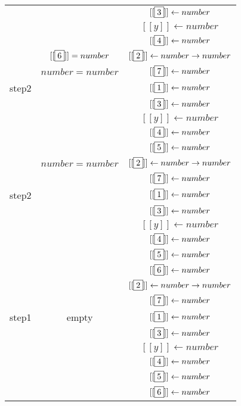 \documentclass[letterpaper,11pt]{article}
\begin{document}
\begin{enumerate}
\begin{center}
\begin{longtable}{|c|c|c|}
            &&$[[\fbox{3}]] \leftarrow number$ \\
            &&$[[y]] \leftarrow number$ \\ 
            &&$[[\fbox{4}]] \leftarrow number$ \\
            \hline
            &$[[\fbox{6}]]=number$&
            $[[\fbox{2}]] \leftarrow number \rightarrow number$ \\ 
            &$number=number$& $[[\fbox{7}]] \leftarrow number$\\
            step2&&$[[\fbox{1}]] \leftarrow number$ \\ 
            &&$[[\fbox{3}]] \leftarrow number$ \\ 
            \hline
            &&$[[y]] \leftarrow number$ \\ 
            &&$[[\fbox{4}]] \leftarrow number$ \\
            &&$[[\fbox{5}]] \leftarrow number$ \\ 
            \hline
            &$number=number$&
            $[[\fbox{2}]] \leftarrow number \rightarrow number$ \\ 
            &&$[[\fbox{7}]] \leftarrow number$ \\ 
            step2&&$[[\fbox{1}]] \leftarrow number$ \\ 
            &&$[[\fbox{3}]] \leftarrow number$ \\
            &&$[[y]] \leftarrow number$\\
            &&$[[\fbox{4}]] \leftarrow number$\\
            &&$[[\fbox{5}]] \leftarrow number$\\
            &&$[[\fbox{6}]] \leftarrow number$\\
            \hline
            &&
            $[[\fbox{2}]] \leftarrow number \rightarrow number$ \\ 
            &&$[[\fbox{7}]] \leftarrow number$ \\ 
            step1&empty&$[[\fbox{1}]] \leftarrow number$ \\ 
            &&$[[\fbox{3}]] \leftarrow number$ \\
            &&$[[y]] \leftarrow number$\\
            &&$[[\fbox{4}]] \leftarrow number$\\
            &&$[[\fbox{5}]] \leftarrow number$\\
            &&$[[\fbox{6}]] \leftarrow number$\\
            \hline
        \end{longtable}
    \end{center}


\end{enumerate}
\end{document}
